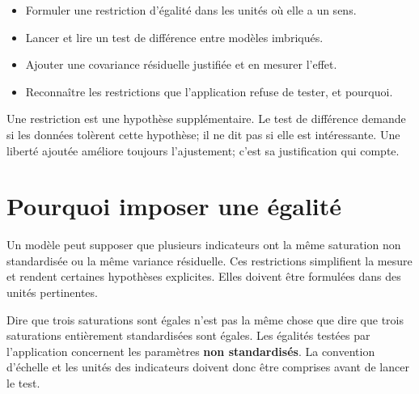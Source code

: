 \documentclass[
  french,
  11pt,
  a4paper,
  DIV=11,
  numbers=noendperiod]{scrreprt}
\providecommand{\tightlist}{%
  \setlength{\itemsep}{0pt}\setlength{\parskip}{0pt}}
\begin{document}
\begin{tcolorbox}[enhanced jigsaw, arc=.35mm, bottomrule=.15mm, bottomtitle=1mm, breakable, colback=white, colbacktitle=quarto-callout-note-color!10!white, colframe=quarto-callout-note-color-frame, coltitle=black, left=2mm, leftrule=.75mm, opacityback=0, opacitybacktitle=0.6, rightrule=.15mm, title={Objectifs du chapitre}, titlerule=0mm, toprule=.15mm, toptitle=1mm]

\begin{itemize}
\tightlist
\item
  Formuler une restriction d'égalité dans les unités où elle a un sens.
\item
  Lancer et lire un test de différence entre modèles imbriqués.
\item
  Ajouter une covariance résiduelle justifiée et en mesurer l'effet.
\item
  Reconnaître les restrictions que l'application refuse de tester, et
  pourquoi.
\end{itemize}

\end{tcolorbox}

\begin{tcolorbox}[enhanced jigsaw, arc=.35mm, bottomrule=.15mm, bottomtitle=1mm, breakable, colback=white, colbacktitle=quarto-callout-tip-color!10!white, colframe=quarto-callout-tip-color-frame, coltitle=black, left=2mm, leftrule=.75mm, opacityback=0, opacitybacktitle=0.6, rightrule=.15mm, title={Idée centrale}, titlerule=0mm, toprule=.15mm, toptitle=1mm]

Une restriction est une hypothèse supplémentaire. Le test de différence
demande si les données tolèrent cette hypothèse; il ne dit pas si elle
est intéressante. Une liberté ajoutée améliore toujours l'ajustement;
c'est sa justification qui compte.

\end{tcolorbox}

\section{Pourquoi imposer une
égalité}\label{pourquoi-imposer-une-uxe9galituxe9}

Un modèle peut supposer que plusieurs indicateurs ont la même saturation
non standardisée ou la même variance résiduelle. Ces restrictions
simplifient la mesure et rendent certaines hypothèses explicites. Elles
doivent être formulées dans des unités pertinentes.

Dire que trois saturations sont égales n'est pas la même chose que dire
que trois saturations entièrement standardisées sont égales. Les
égalités testées par l'application concernent les paramètres \textbf{non
standardisés}. La convention d'échelle et les unités des indicateurs
doivent donc être comprises avant de lancer le test.
\end{document}
